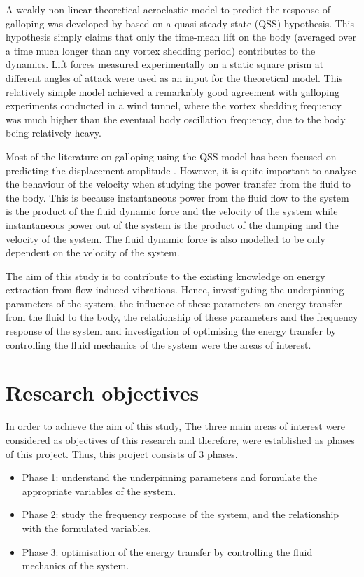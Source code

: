 \documentclass[authoryear,12pt]{article}
\begin{document}
A weakly non-linear theoretical aeroelastic model to predict the response of galloping was developed by \citet{Parkinson1964} based on a quasi-steady state (QSS) hypothesis. This hypothesis simply claims that only the time-mean lift on the body (averaged over a time much longer than any vortex shedding period) contributes to the dynamics. Lift forces measured experimentally on a static square prism at different angles of attack were used as an input for the theoretical model. This relatively simple model achieved a remarkably good agreement with galloping experiments conducted in a wind tunnel, where the vortex shedding frequency was much higher than the eventual body oscillation frequency, due to the body being relatively heavy.

Most of the literature on galloping using the QSS model has been focused on predicting the displacement amplitude \citep{Parkinson1964,Joly2012,Luo2003}. However, it is quite important to analyse the behaviour of the velocity when studying the power transfer from the fluid to the body. This is because instantaneous power from the fluid flow to the system is the product of the fluid dynamic force and the velocity of the system while instantaneous power out of the system is the product of the damping and the velocity of the system. The fluid dynamic force is also modelled to be only dependent on the velocity of the system. 

The aim of this study is to contribute to the existing knowledge on energy extraction from flow induced vibrations. Hence, investigating the underpinning parameters of the system, the influence of these parameters on energy transfer from the fluid to the body, the relationship of these parameters and the frequency response of the system and investigation  of optimising the energy transfer by controlling the fluid mechanics of the system were the areas of interest.    


\section{Research objectives}

In order to achieve the aim of this study, The three main areas of interest were considered as objectives of this research and therefore, were established as phases of this project. Thus, this project consists of 3 phases. 

\begin{itemize}
\item  Phase 1: understand the underpinning parameters and formulate the appropriate variables of the system.
\item  Phase 2: study the frequency response of the system, and the relationship with the formulated variables.
\item  Phase 3: optimisation of the energy transfer by controlling the fluid mechanics of the system.
\end{itemize}   
\end{document}
